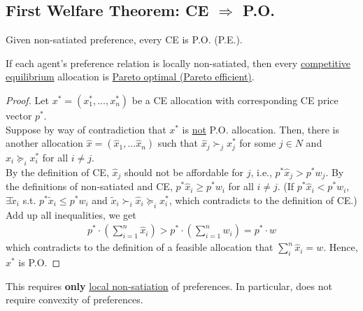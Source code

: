 \documentclass[11pt]{elegantbook}
\begin{document}
\subsection{First Welfare Theorem: CE $\Rightarrow$ P.O.}
Given non-satiated preference, every CE is P.O. (P.E.).
\begin{theorem}
    If each agent's preference relation is locally non-satiated, then every \underline{competitive equilibrium} allocation is \underline{Pareto optimal (Pareto efficient)}.
\end{theorem}
\begin{proof}
    Let $x^*=(x_1^*,...,x_n^*)$ be a CE allocation with corresponding CE price vector $p^*$.\\
    Suppose by way of contradiction that $x^*$ is \underline{not} P.O. allocation. Then, there is another allocation $\hat{x}=(\hat{x}_1,...\hat{x}_n)$ such that $\hat{x}_j\succ_j x^*_j$ for some $j\in N$ and $\hat{x}_i\succeq_i x^*_i$ for all $i\neq j$.\\
    By the definition of CE, $\hat{x}_j$ should not be affordable for $j$, i.e., $p^*\hat{x}_j>p^*w_j$. By the definitions of non-satiated and CE, $p^*\hat{x}_i\geq p^*w_i$ for all $i\neq j$. (If $p^*\hat{x}_i<p^*w_i$, $\exists \tilde{x}_i$ s.t. $p^*\tilde{x}_i\leq p^*w_i$ and $\tilde{x}_i\succ_i\hat{x}_i\succeq_i x_i^*$, which contradicts to the definition of CE.)\\
    Add up all inequalities, we get
    \begin{equation}
        \begin{aligned}
            p^*\cdot\left(\sum_{i=1}^n\hat{x}_i\right)> p^*\cdot\left(\sum_{i=1}^n w_i\right)=p^*\cdot w
        \end{aligned}
        \nonumber
    \end{equation}
    which contradicts to the definition of a feasible allocation that $\sum_{i}^n \hat{x}_i=w$. Hence, $x^*$ is P.O.
\end{proof}
\begin{note}
    This requires \textbf{only} \underline{local non-satiation} of preferences. In particular, does not require convexity of preferences.
\end{note}
\end{document}
